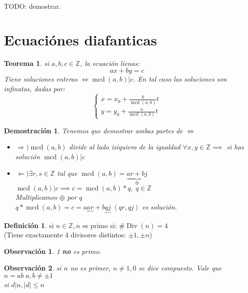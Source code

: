 \documentclass[9pt,a4paper,draft]{article}
\theoremstyle{definition}
\newtheorem{defi}{Definición}
\theoremstyle{plain}
\newtheorem{teo}{Teorema}
\newtheorem{demo}{Demostración}[teo]
\newtheorem{obs}{Observación}
\DeclareMathOperator{\Div}{Div}
\DeclareMathOperator{\mcd}{mcd}
\begin{document}
TODO: demostrar.

\section{Ecuaciónes diafanticas}

\begin{teo} si $a,b,c \in{\mathbb{Z}}$, la ecuación lienas:
$$ax+by=c$$
Tiene soluciones enteras $\iff \mcd(a,b)|c$. En tal caso las soluciones son infinatas, dadas por:
\[
\begin{cases}
x = x_0 + \frac{b}{\mcd(a,b)}t \\
y = y_0 + \frac{a}{\mcd(a,b)} t 
\end{cases}
\]
\end{teo}
\begin{demo} Tenemos que demostrar ambas partes de $\iff$\\
\begin{itemize}
\item $\Rightarrow) \mcd(a,b)$ divide al lado iziquiero de la igualdad $\forall{x,y}\in{\mathbb{Z}} \implies$ si has solución $\mcd(a,b)|c$ \\
\item $\Leftarrow) \exists{r,s}\in{\mathbb{Z}}$ tal que $\mcd(a,b) = \underbrace{ar+bj}_{\oplus}$ \\
$\mcd(a,b)|c \implies c = \mcd(a,b)*q,\; q\in{\mathbb{Z}}$\\
Multiplicamos $\oplus$ por $q$\\
$q*\mcd(a,b) = c = a\underbrace{ar}+b\underbrace{qj}\; (qr, qj)$ es solución.
\end{itemize}
\end{demo}

\begin{defi} si $n\in{\mathbb{Z}}, n$ es primo si: $\#\Div(n)=4$ \\
(Tiene exactamente 4 divisores distintos: $\pm1, \pm n$)\end{defi}

\begin{obs}
1 {\bfseries no} es primo. 
\end{obs}

\begin{obs}
si $n$ no es primer, $n\neq{1,0}$ se dice compuesto. Vale que $n=ab\; a,b\neq\pm1$\\
si $d|n, |d|\leq{n}$
\end{obs}
\end{document}
